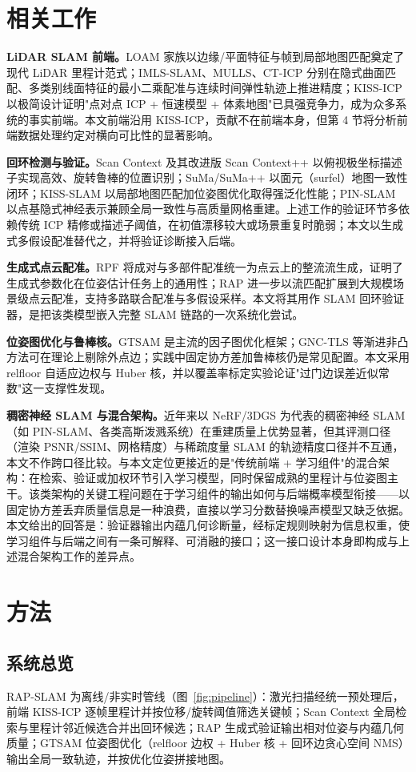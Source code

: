\documentclass[UTF8,12pt]{ctexart}
\begin{document}
\section{相关工作}
\textbf{LiDAR SLAM 前端。}LOAM 家族以边缘/平面特征与帧到局部地图匹配奠定了现代 LiDAR 里程计范式；IMLS-SLAM、MULLS、CT-ICP 分别在隐式曲面匹配、多类别线面特征的最小二乘配准与连续时间弹性轨迹上推进精度；KISS-ICP 以极简设计证明"点对点 ICP + 恒速模型 + 体素地图"已具强竞争力，成为众多系统的事实前端。本文前端沿用 KISS-ICP，贡献不在前端本身，但第 4 节将分析前端数据处理约定对横向可比性的显著影响。

\textbf{回环检测与验证。}Scan Context 及其改进版 Scan Context++ 以俯视极坐标描述子实现高效、旋转鲁棒的位置识别；SuMa/SuMa++ 以面元（surfel）地图一致性闭环；KISS-SLAM 以局部地图匹配加位姿图优化取得强泛化性能；PIN-SLAM 以点基隐式神经表示兼顾全局一致性与高质量网格重建。上述工作的验证环节多依赖传统 ICP 精修或描述子阈值，在初值漂移较大或场景重复时脆弱；本文以生成式多假设配准替代之，并将验证诊断接入后端。

\textbf{生成式点云配准。}RPF 将成对与多部件配准统一为点云上的整流流生成，证明了生成式参数化在位姿估计任务上的通用性；RAP 进一步以流匹配扩展到大规模场景级点云配准，支持多路联合配准与多假设采样。本文将其用作 SLAM 回环验证器，是把该类模型嵌入完整 SLAM 链路的一次系统化尝试。

\textbf{位姿图优化与鲁棒核。}GTSAM 是主流的因子图优化框架；GNC-TLS 等渐进非凸方法可在理论上剔除外点边；实践中固定协方差加鲁棒核仍是常见配置。本文采用 relfloor 自适应边权与 Huber 核，并以覆盖率标定实验论证"过门边误差近似常数"这一支撑性发现。

\textbf{稠密神经 SLAM 与混合架构。}近年来以 NeRF/3DGS 为代表的稠密神经 SLAM（如 PIN-SLAM、各类高斯泼溅系统）在重建质量上优势显著，但其评测口径（渲染 PSNR/SSIM、网格精度）与稀疏度量 SLAM 的轨迹精度口径并不互通，本文不作跨口径比较。与本文定位更接近的是"传统前端 + 学习组件"的混合架构：在检索、验证或加权环节引入学习模型，同时保留成熟的里程计与位姿图主干。该类架构的关键工程问题在于学习组件的输出如何与后端概率模型衔接——以固定协方差丢弃质量信息是一种浪费，直接以学习分数替换噪声模型又缺乏依据。本文给出的回答是：验证器输出内蕴几何诊断量，经标定规则映射为信息权重，使学习组件与后端之间有一条可解释、可消融的接口；这一接口设计本身即构成与上述混合架构工作的差异点。

\section{方法}
\subsection{系统总览}
RAP-SLAM 为离线/非实时管线（图~\ref{fig:pipeline}）：激光扫描经统一预处理后，前端 KISS-ICP 逐帧里程计并按位移/旋转阈值筛选关键帧；Scan Context 全局检索与里程计邻近候选合并出回环候选；RAP 生成式验证输出相对位姿与内蕴几何质量；GTSAM 位姿图优化（relfloor 边权 + Huber 核 + 回环边贪心空间 NMS）输出全局一致轨迹，并按优化位姿拼接地图。
\end{document}
